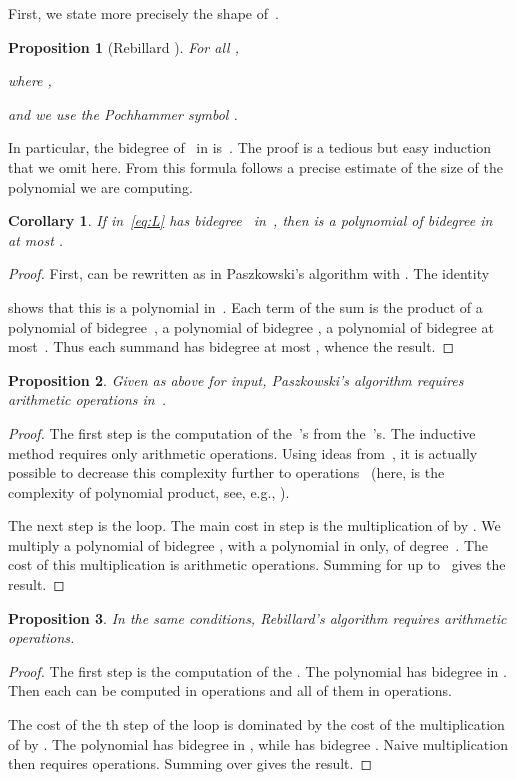 \documentclass{amsart}
\newtheorem{prop}{Proposition}
\newtheorem{corollary}{Corollary}
\theoremstyle{definition}
\begin{document}
First, we state more precisely the shape of~.
\begin{prop}[Rebillard \cite{Rebillard1998}]
	\label{Di}
	For all ,

where ,

and we use the Pochhammer symbol .
\end{prop}
In particular, the bidegree of~ in  is~. The proof is a tedious but easy induction that we omit here. From this formula follows a precise estimate of the size of the polynomial we are computing.
\begin{corollary}\label{coro:size}If  in~\eqref{eq:L} has bidegree~ in~, then  is a polynomial of bidegree  in~ at most .
\end{corollary}
\begin{proof}
First,  can be rewritten as in Paszkowski's algorithm  with . The identity

shows that this is a polynomial in~. Each term of the sum is the product of a polynomial of bidegree~, a polynomial of bidegree , a polynomial of bidegree at most~. Thus each summand has bidegree at most , whence the result.
\end{proof}
\begin{prop}\label{theoPasz}Given  as above for input, Paszkowski's algorithm requires~ arithmetic operations in~.
\end{prop}
\begin{proof}
The first step is the computation of the~'s from the~'s. 
The inductive method requires only  arithmetic operations. 
Using ideas from~\cite{BoChLR08}, it is actually possible to decrease this complexity further to  operations~\cite{Bo09} (here,  is the complexity of polynomial product, see, e.g., \cite{GathenGerhard1999}).

The next step is the loop. The main cost in step  is the multiplication of  by . We multiply a polynomial of bidegree , with a polynomial in  only, of degree~. The cost of this multiplication is  arithmetic operations.
Summing for  up to~ gives the result.
\end{proof}



\begin{prop}
In the same conditions,	Rebillard's algorithm requires  arithmetic operations.
\end{prop}
\begin{proof}
The first step is the computation of the . The polynomial  has bidegree  in . Then each  can be computed in  operations and all of them in  operations.

The cost of the th step of the loop is dominated by the cost of the multiplication of  by .
The polynomial  has bidegree  in , while  has bidegree . Naive multiplication then requires  operations. Summing over  gives the result.
\end{proof} 
\end{document}
